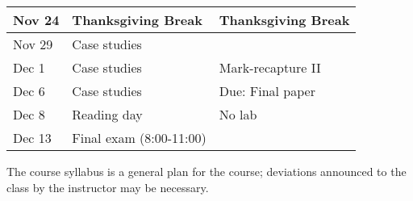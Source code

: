 \documentclass[12pt]{article}
\begin{document}
\begin{center}
\begin{tabular}[c]{lll}
Nov 24     & Thanksgiving Break                 & Thanksgiving Break                   \\
\hline
Nov 29     & Case studies                       &                                      \\
Dec 1      & Case studies                       & Mark-recapture II                    \\
\hline
Dec 6      & Case studies                       & Due: Final paper                     \\
Dec 8      & Reading day                        & No lab                               \\
\hline
Dec 13     & Final exam (8:00-11:00)            &                                      \\
\hline \hline
\end{tabular}
\end{center}

The course syllabus is a general plan for the course; deviations announced to the class by the instructor may be necessary.
\end{document}
